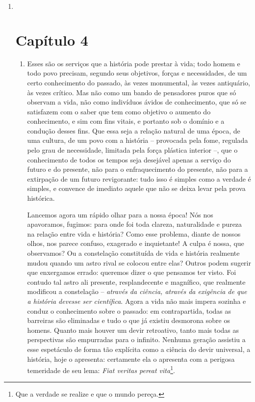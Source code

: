 \begin{enumerate}
\item ~
  \chapter{Capítulo 4}\label{capuxedtulo-4}

  \begin{enumerate}
  \item
    Esses são os serviços que a história pode prestar à vida; todo homem
    e todo povo precisam, segundo seus objetivos, forças e necessidades,
    de um certo conhecimento do passado, às vezes monumental, às vezes
    antiquário, às vezes crítico. Mas não como um bando de pensadores
    puros que só observam a vida, não como indivíduos ávidos de
    conhecimento, que só se satisfazem com o saber que tem como objetivo
    o aumento do conhecimento, e sim com fins vitais, e portanto sob o
    domínio e a condução desses fins. Que essa seja a relação natural de
    uma época, de uma cultura, de um povo com a história -- provocada
    pela fome, regulada pelo grau de necessidade, limitada pela força
    plástica interior --, que o conhecimento de todos os tempos seja
    desejável apenas a serviço do futuro e do presente, não para o
    enfraquecimento do presente, não para a extirpação de um futuro
    revigorante: tudo isso é simples como a verdade é simples, e
    convence de imediato aquele que não se deixa levar pela prova
    histórica.

    Lancemos agora um rápido olhar para a nossa época! Nós nos
    apavoramos, fugimos: para onde foi toda clareza, naturalidade e
    pureza na relação entre vida e história? Como esse problema, diante
    de nossos olhos, nos parece confuso, exagerado e inquietante! A
    culpa é nossa, que observamos? Ou a constelação constituída de vida
    e história realmente mudou quando um astro rival se colocou entre
    elas? Outros podem sugerir que enxergamos errado: queremos dizer o
    que pensamos ter visto. Foi contudo tal astro ali presente,
    resplandecente e magnífico, que realmente modificou a constelação --
    \emph{através da ciência, através da exigência de que a história
    devesse ser científica}. Agora a vida não mais impera sozinha e
    conduz o conhecimento sobre o passado: em contrapartida, todas as
    barreiras são eliminadas e tudo o que já existiu desmorona sobre os
    homens. Quanto mais houver um devir retroativo, tanto mais todas as
    perspectivas são empurradas para o infinito. Nenhuma geração
    assistiu a esse espetáculo de forma tão explícita como a ciência do
    devir universal, a história, hoje o apresenta: certamente ela o
    apresenta com a perigosa temeridade de seu lema: \emph{Fiat veritas
    pereat vita}\footnote{Que a verdade se realize e que o mundo pereça.}.


\end{enumerate}
\end{enumerate}
